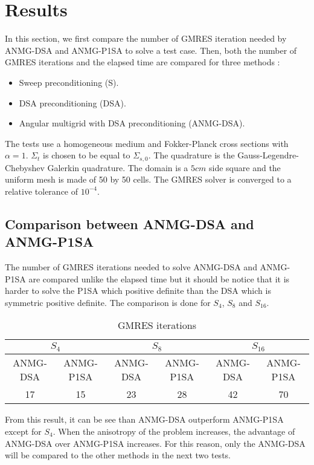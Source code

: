 \section{Results}
In this section, we first compare the number of GMRES iteration needed by 
ANMG-DSA and ANMG-P1SA to solve a test case. Then, both the number of GMRES 
iterations and the elapsed time are compared for three methods :
\begin{itemize}
\item Sweep preconditioning (S).
\item DSA preconditioning (DSA).
\item Angular multigrid with DSA preconditioning (ANMG-DSA).
\end{itemize}
The tests use a homogeneous medium and Fokker-Planck cross
sections with $\alpha=1$. $\Sigma_{t}$ is chosen to be equal to
$\Sigma_{s,0}$. The quadrature is the Gauss-Legendre-Chebyshev Galerkin
quadrature. The domain is a $5cm$ side square and the uniform mesh is made 
of 50 by 50 
cells. The GMRES solver is converged to a relative tolerance of $10^{-4}$.
\subsection{Comparison between ANMG-DSA and ANMG-P1SA}
The number of GMRES iterations needed to solve ANMG-DSA and
ANMG-P1SA are compared unlike the elapsed time but it should be notice that it is
harder to solve the P1SA which positive definite than the DSA which is
symmetric positive definite. The comparison is done for $S_4$, $S_8$ and
$S_{16}$. 
\begin{table}[H]
\begin{center}
\begin{tabular}{|c|c|c|c|c|c|}
\hline
\multicolumn{2}{|c|}{$S_4$} & \multicolumn{2}{c|}{$S_8$} &
\multicolumn{2}{c|}{$S_{16}$}\\
\hline
ANMG-DSA & ANMG-P1SA & ANMG-DSA & ANMG-P1SA & ANMG-DSA & ANMG-P1SA\\
\hline
17 &  15 & 23 & 28 & 42 & 70\\
\hline
\end{tabular}
\caption{GMRES iterations}
\end{center}
\end{table}
From this result, it can be see than ANMG-DSA outperform ANMG-P1SA except for
$S_4$. When the anisotropy of the problem increases, the advantage of ANMG-DSA
over ANMG-P1SA increases. For this reason, only the ANMG-DSA will be compared
to the other methods in the next two tests.
